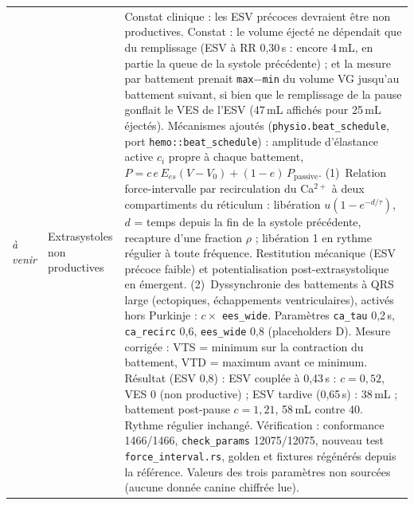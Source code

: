 \documentclass[11pt,a4paper]{article}
\newcommand{\ecart}[1]{\textcolor{red!60!black}{#1}}
\begin{document}
\begin{longtable}{@{}p{1.5cm}p{4.2cm}p{10.3cm}@{}}
\textit{à venir} & Extrasystoles non productives & Constat clinique : les ESV précoces devraient être non productives. Constat : le volume éjecté ne dépendait que du remplissage (ESV à RR 0,30\,s : encore 4\,mL, en partie la queue de la systole précédente) ; et la mesure par battement prenait \texttt{max}$-$\texttt{min} du volume VG jusqu'au battement suivant, si bien que le remplissage de la pause gonflait le VES de l'ESV (47\,mL affichés pour 25\,mL éjectés). Mécanismes ajoutés (\texttt{physio.beat\_schedule}, port \texttt{hemo::beat\_schedule}) : amplitude d'élastance active $c_i$ propre à chaque battement, $P = c\,e\,E_{es}(V-V_0) + (1-e)\,P_{\mathrm{passive}}$. (1)~Relation force-intervalle par recirculation du Ca$^{2+}$ à deux compartiments du réticulum \citep{schouten1987,wier1986} : libération $u(1-e^{-d/\tau})$, $d$ = temps depuis la fin de la systole précédente, recapture d'une fraction $\rho$ ; libération 1 en rythme régulier à toute fréquence. Restitution mécanique (ESV précoce faible) et potentialisation post-extrasystolique \citep{cooper1993} en émergent. (2)~Dyssynchronie des battements à QRS large (ectopiques, échappements ventriculaires), activés hors Purkinje \citep{prinzen1999} : $c \times$ \texttt{ees\_wide}. Paramètres \texttt{ca\_tau} 0,2\,s, \texttt{ca\_recirc} 0,6, \texttt{ees\_wide} 0,8 (placeholders D). Mesure corrigée : VTS = minimum sur la contraction du battement, VTD = maximum avant ce minimum. Résultat (ESV 0,8) : ESV couplée à 0,43\,s : $c=0{,}52$, VES 0 (non productive) ; ESV tardive (0,65\,s) : 38\,mL ; battement post-pause $c=1{,}21$, 58\,mL contre 40. Rythme régulier inchangé. Vérification : conformance 1466/1466, \texttt{check\_params} 12075/12075, nouveau test \texttt{force\_interval.rs}, golden et fixtures régénérés depuis la référence. \ecart{Valeurs des trois paramètres non sourcées (aucune donnée canine chiffrée lue).}\\

\end{longtable}
\end{document}

